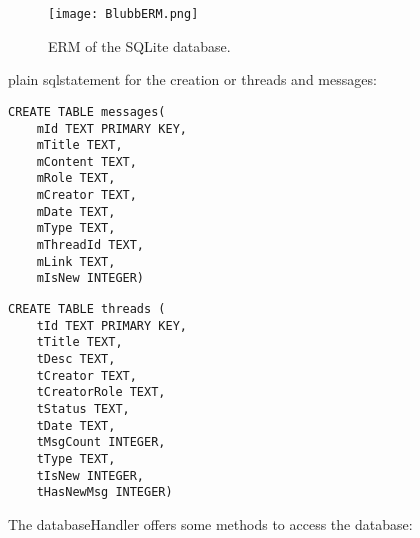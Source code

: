 \documentclass[12pt,a4paper,oneside]{report}
\begin{document}
\begin{figure}[!ht]
	\centering
    \texttt{[image: BlubbERM.png]}
	\caption{ERM of the SQLite database.}
\end{figure}


plain sqlstatement for the creation or threads and messages:
\lstset{language=SQL}
\begin{lstlisting}[caption=SQL code for creating the table messages]
CREATE TABLE messages(
	mId TEXT PRIMARY KEY,
	mTitle TEXT,
	mContent TEXT,
	mRole TEXT,
	mCreator TEXT,
	mDate TEXT,
	mType TEXT,
	mThreadId TEXT,
	mLink TEXT,
	mIsNew INTEGER)
\end{lstlisting}
\label{SQLTableMessages}
\begin{lstlisting}[caption=SQL code for creating the table threads]
CREATE TABLE threads (
	tId TEXT PRIMARY KEY,
	tTitle TEXT,
	tDesc TEXT,
	tCreator TEXT,
	tCreatorRole TEXT,
	tStatus TEXT,
	tDate TEXT, 
	tMsgCount INTEGER,
	tType TEXT,
	tIsNew INTEGER,
	tHasNewMsg INTEGER)
\end{lstlisting}
\label{SQLTableThreads}
\lstset{language=Java}

The databaseHandler offers some methods to access the database:
\end{document}
